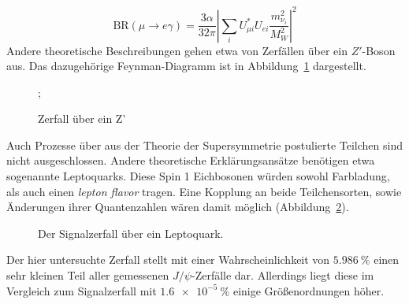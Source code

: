 %
\begin{equation}\label{eq:BRmuega}
  \text{BR}(\mu\rightarrow e\gamma)=\frac{3\alpha}{32\pi}\left|\sum_i U_{\mu i}^*U_{ei}\frac{m^2_{\nu_i}}{M^2_W}\right|^2
\end{equation}
%
Andere theoretische Beschreibungen gehen etwa von Zerfällen über ein $Z'$-Boson aus\cite{zprime}. Das dazugehörige Feynman-Diagramm ist in Abbildung~\ref{fig:Zprime} dargestellt.
%
\begin{figure}
  \centering
  ;
\caption{Zerfall über ein Z'}
\label{fig:Zprime}
\end{figure}
%
Auch Prozesse über aus der Theorie der Supersymmetrie postulierte Teilchen sind nicht ausgeschlossen\cite{susy_gut1}\cite{susy_gut2}. Andere theoretische Erklärungsansätze benötigen etwa sogenannte Leptoquarks. Diese Spin 1 Eichbosonen würden sowohl Farbladung, als auch einen \textit{lepton flavor} tragen. Eine Kopplung an beide Teilchensorten, sowie Änderungen ihrer Quantenzahlen wären damit möglich (Abbildung~\ref{fig:lepto}).
%
\begin{figure}[H]
  \centering
    \caption{Der Signalzerfall über ein Leptoquark.}
    \label{fig:lepto}
  \end{figure}
%
Der hier untersuchte Zerfall \kontroll stellt mit einer Wahrscheinlichkeit von $\SI{5,986}{\percent}$ einen sehr kleinen Teil aller gemessenen $J/\!\psi$-Zerfälle dar\cite{pdg}. Allerdings liegt diese im Vergleich zum Signalzerfall \signal mit $\SI{1,6e-5}{\percent}$ einige Größenordnungen höher\cite{pdg}.
